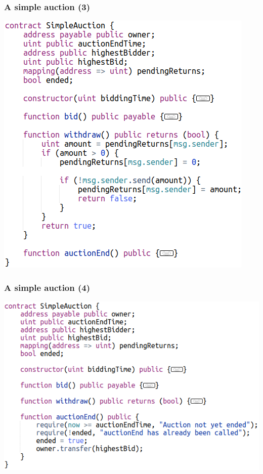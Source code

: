 \documentclass[11pt]{beamer}  %
\begin{document}
\begin{frame}\frametitle{A simple auction (3)}

  \begin{center}
    \includegraphics[scale=0.4,clip=false]{pictures/simple-auction-3.png}
  \end{center}

\end{frame}

\begin{frame}\frametitle{A simple auction (4)}

  \begin{center}
    \includegraphics[scale=0.5,clip=false]{pictures/simple-auction-4.png}
  \end{center}

\end{frame}
\end{document}
